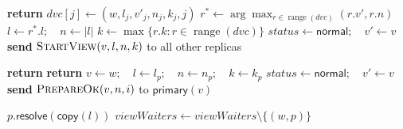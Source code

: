 \begin{algorithm}[!tb]
  \caption{Viewstamped Replication: Installing a New View}
  \label{vr-install-view}
  \begin{algorithmic}[1]
        \State \textbf{return}
      \EndIf
        \State {}
      \EndIf
       
        \State $\mathit{dvc}[j]\gets(w,l_j,v'_j,n_j,k_j,j)$
          \State $r^*\gets\arg\max_{r\in\operatorname{range}(\mathit{dvc})}(r.v',r.n)$
          \State {}
          \State $l\gets r^*.l;\quad n\gets |l|$
          \State $k\gets\max\{r.k:r\in\operatorname{range}(\mathit{dvc})\}$
          \State $\mathit{status}\gets\mathsf{normal};\quad v'\gets v$
          \State {}
          \State \textbf{send} $\textsc{StartView}(v,l,n,k)$
            to all other replicas
        \EndIf
      \EndIf
    \EndProcedure

        \State \textbf{return}
      \EndIf
       
        \State \textbf{return}
      \EndIf
      \State $v\gets w;\quad l\gets l_p;\quad n\gets n_p;\quad k\gets k_p$
      \State $\mathit{status}\gets\mathsf{normal};\quad v'\gets v$
      \State {}
        \State \textbf{send} $\textsc{PrepareOk}(v,n,i)$
          to $\mathsf{primary}(v)$
      \EndIf
    \EndProcedure

        \State $p.\mathsf{resolve}(\mathsf{copy}(l))$
        \State $\mathit{viewWaiters}\gets
          \mathit{viewWaiters}\setminus\{(w,p)\}$
      \EndIf
    \EndFor
  \EndProcedure
  \end{algorithmic}
\end{algorithm}

